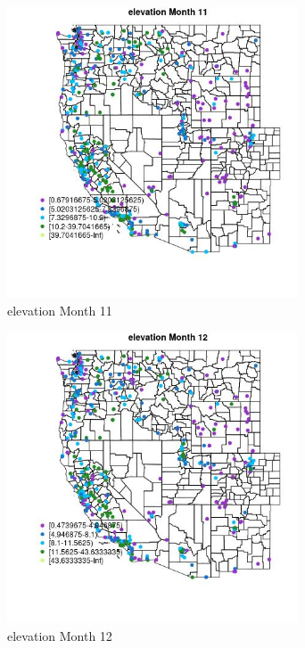\begin{figure} 
\centering  
\includegraphics[width=0.77\textwidth]{Code_Outputs/ML_input_report_ML_input_PM25_Step5_part_d_de_duplicated_aves_ML_input_MapObsMo11elevation.jpg} 
\caption{\label{fig:ML_input_report_ML_input_PM25_Step5_part_d_de_duplicated_aves_ML_inputMapObsMo11elevation}elevation Month 11} 
\end{figure} 
 

\begin{figure} 
\centering  
\includegraphics[width=0.77\textwidth]{Code_Outputs/ML_input_report_ML_input_PM25_Step5_part_d_de_duplicated_aves_ML_input_MapObsMo12elevation.jpg} 
\caption{\label{fig:ML_input_report_ML_input_PM25_Step5_part_d_de_duplicated_aves_ML_inputMapObsMo12elevation}elevation Month 12} 
\end{figure} 
 

